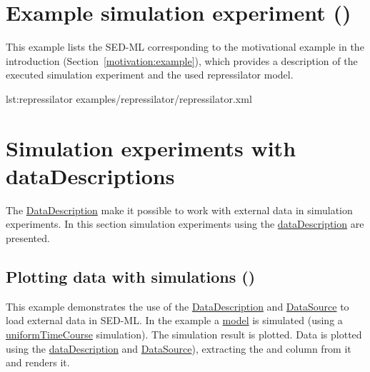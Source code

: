 \section{Example simulation experiment ()}
\label{example:repressilator}
This example lists the SED-ML corresponding to the motivational example in the introduction (Section~\ref{motivation:example}), which provides a description of the executed simulation experiment and the used repressilator model. 

{lst:repressilator}
{examples/repressilator/repressilator.xml}

\pagebreak
\section{Simulation experiments with dataDescriptions}
The \hyperref[class:dataDescription]{DataDescription} make it possible to work with external data in simulation experiments. In this section simulation experiments using the \hyperref[class:dataDescription]{dataDescription} are presented.

\subsection{Plotting data with simulations ()}
This example demonstrates the use of the \hyperref[class:dataDescription]{DataDescription} and \hyperref[class:dataSource]{DataSource} to load external data in SED-ML. In the example a \hyperref[class:model]{model} is simulated (using a \hyperref[class:uniformTimeCourse]{uniformTimeCourse} simulation). The simulation result is plotted. Data is plotted using the \hyperref[class:dataDescription]{dataDescription} and \hyperref[class:dataSource]{DataSource}), extracting the  and  column from it and renders it.

